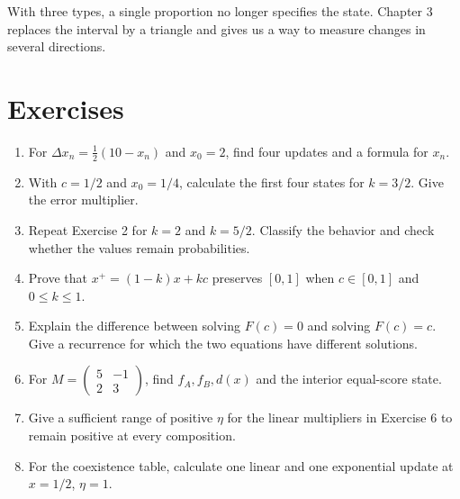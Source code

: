 \documentclass[11pt,oneside,openany]{book}
\theoremstyle{definition}
\theoremstyle{remark}
\newenvironment{exercises}{\begin{enumerate}[label=\thechapter.\arabic*,ref=\thechapter.\arabic*,leftmargin=2.8em,itemsep=6pt]}{\end{enumerate}}
\numberwithin{equation}{chapter}
\begin{document}
With three types, a single proportion no longer specifies the state. Chapter 3 replaces the interval by a triangle and gives us a way to measure changes in several directions.

\section{Exercises}\label{ch02-exercises}

\begin{exercises}

\item 

For \(\Delta x_n=\tfrac12(10-x_n)\) and \(x_0=2\), find four updates and a formula for \(x_n\).

\item 

With \(c=1/2\) and \(x_0=1/4\), calculate the first four states for \(k=3/2\). Give the error multiplier.

\item 

Repeat Exercise 2 for \(k=2\) and \(k=5/2\). Classify the behavior and check whether the values remain probabilities.

\item 

Prove that \(x^+=(1-k)x+kc\) preserves \([0,1]\) when \(c\in[0,1]\) and \(0\leq k\leq1\).

\item 

Explain the difference between solving \(F(c)=0\) and solving \(F(c)=c\). Give a recurrence for which the two equations have different solutions.

\item 

For \(M=\left(\begin{smallmatrix}5&-1\\2&3\end{smallmatrix}\right)\), find \(f_A,f_B,d(x)\) and the interior equal-score state.

\item 

Give a sufficient range of positive \(\eta\) for the linear multipliers in Exercise 6 to remain positive at every composition.

\item 

For the coexistence table, calculate one linear and one exponential update at \(x=1/2\), \(\eta=1\).


\end{exercises}
\end{document}
